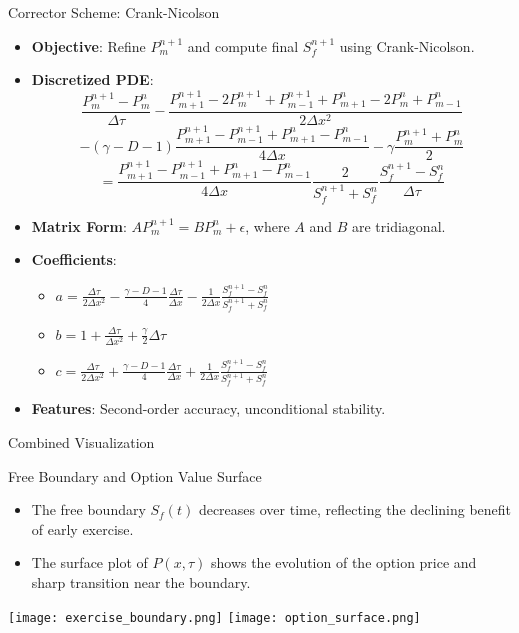 \documentclass{beamer}
\begin{document}
\begin{frame}{Corrector Scheme: Crank-Nicolson}
    \begin{itemize}
        \item \textbf{Objective}: Refine \( P_m^{n+1} \) and compute final \( S_f^{n+1} \) using Crank-Nicolson.
        \item \textbf{Discretized PDE}:
        \[
        \frac{P_m^{n+1} - P_m^n}{\Delta \tau} - \frac{P_{m+1}^{n+1} - 2 P_m^{n+1} + P_{m-1}^{n+1} + P_{m+1}^n - 2 P_m^n + P_{m-1}^n}{2 \Delta x^2}
        \]
        \[
        - (\gamma - D - 1) \frac{P_{m+1}^{n+1} - P_{m-1}^{n+1} + P_{m+1}^n - P_{m-1}^n}{4 \Delta x} - \gamma \frac{P_m^{n+1} + P_m^n}{2}
        \]
        \[
        = \frac{P_{m+1}^{n+1} - P_{m-1}^{n+1} + P_{m+1}^n - P_{m-1}^n}{4 \Delta x} \frac{2}{S_f^{n+1} + S_f^n} \frac{S_f^{n+1} - S_f^n}{\Delta \tau}
        \]
        \item \textbf{Matrix Form}: \( A P_m^{n+1} = B P_m^n + \epsilon \), where \( A \) and \( B \) are tridiagonal.
        \item \textbf{Coefficients}:
        \begin{itemize}
            \item \( a = \frac{\Delta \tau}{2 \Delta x^2} - \frac{\gamma - D - 1}{4} \frac{\Delta \tau}{\Delta x} - \frac{1}{2 \Delta x} \frac{S_f^{n+1} - S_f^n}{S_f^{n+1} + S_f^n} \)
            \item \( b = 1 + \frac{\Delta \tau}{\Delta x^2} + \frac{\gamma}{2} \Delta \tau \)
            \item \( c = \frac{\Delta \tau}{2 \Delta x^2} + \frac{\gamma - D - 1}{4} \frac{\Delta \tau}{\Delta x} + \frac{1}{2 \Delta x} \frac{S_f^{n+1} - S_f^n}{S_f^{n+1} + S_f^n} \)
        \end{itemize}
        \item \textbf{Features}: Second-order accuracy, unconditional stability.
    \end{itemize}
\end{frame}

Combined Visualization
\begin{frame}{Free Boundary and Option Value Surface}
  \begin{itemize}
    \item The free boundary $S_f(t)$ decreases over time, reflecting the declining benefit of early exercise.
    \item The surface plot of $P(x, \tau)$ shows the evolution of the option price and sharp transition near the boundary.
  \end{itemize}
  \begin{center}
    \texttt{[image: exercise\_boundary.png]}\hspace{0.5cm}
    \texttt{[image: option\_surface.png]}
  \end{center}
\end{frame}
\end{document}
